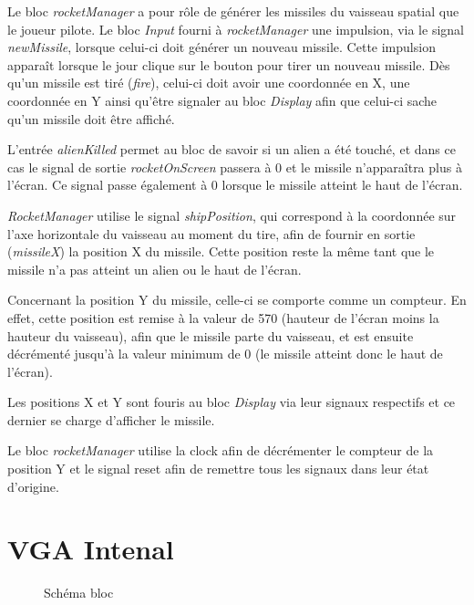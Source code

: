 \documentclass[french]{nakrule}
\begin{document}
Le bloc \emph{rocketManager} a pour rôle de générer les missiles du vaisseau
spatial que le joueur pilote. Le bloc \emph{Input} fourni à \emph{rocketManager}
une impulsion, via le signal \emph{newMissile}, lorsque celui-ci doit générer un
nouveau missile. Cette impulsion apparaît lorsque le jour clique sur le bouton
pour tirer un nouveau missile. Dès qu'un missile est tiré (\emph{fire}), celui-ci doit avoir
une coordonnée en X, une coordonnée en Y ainsi qu'être signaler au bloc
\emph{Display} afin que celui-ci sache qu'un missile doit être affiché.

L'entrée \emph{alienKilled} permet au bloc de savoir si un alien a été touché,
et dans ce cas le signal de sortie \emph{rocketOnScreen} passera à 0 et le
missile n'apparaîtra plus à l'écran. Ce signal passe
également à 0 lorsque le missile atteint le haut de l'écran.

\emph{RocketManager} utilise le signal \emph{shipPosition}, qui correspond à la
coordonnée sur l'axe horizontale du vaisseau au moment du tire, afin de fournir
en sortie (\emph{missileX}) la position X du missile. Cette position reste la
même tant que le missile n'a pas atteint un alien ou le haut de l'écran.

Concernant la position Y du missile, celle-ci se comporte comme un compteur. En
effet, cette position est remise à la valeur de 570 (hauteur de l'écran moins la
hauteur du vaisseau), afin que le missile parte du vaisseau, et est ensuite
décrémenté jusqu'à la valeur minimum de 0 (le missile atteint donc le haut de
l'écran).

Les positions X et Y sont fouris au bloc \emph{Display} via leur signaux
respectifs et ce dernier se charge d'afficher le missile.

Le bloc \emph{rocketManager} utilise la clock afin de décrémenter le compteur de
la position Y et le signal reset afin de remettre tous les signaux dans leur
état d'origine.


\clearpage

\section{VGA Intenal}
\label{sec:vgainternal}


\begin{figure}
\caption{Schéma bloc}
\label{vgaInternalBloc}
\end{figure}
\end{document}
